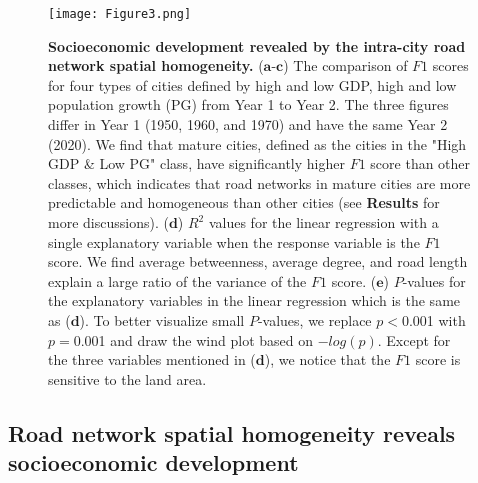 \documentclass[10pt]{wlscirep}
\begin{document}
\begin{figure}[H]
\centering
\begin{minipage}{1.00\textwidth}
    \centering
  \texttt{[image: Figure3.png]}
  \label{fig:3}
\end{minipage}
\caption{\footnotesize
\textbf{Socioeconomic development revealed by the intra-city road network spatial homogeneity.} ($\textbf{a}$-$\textbf{c}$) The comparison of $F1$ scores for four types of cities defined by high and low GDP, high and low population growth (PG) from Year 1 to Year 2. The three figures differ in Year 1 (1950, 1960, and 1970) and have the same Year 2 (2020). We find that mature cities, defined as the cities in the "High GDP \& Low PG" class, have significantly higher $F1$ score than other classes, which indicates that road networks in mature cities are more predictable and homogeneous than other cities (see \textbf{Results} for more discussions). ($\textbf{d}$) $R^{2}$ values for the linear regression with a single explanatory variable when the response variable is the $F1$ score. We find average betweenness, average degree, and road length explain a large ratio of the variance of the $F1$ score. ($\textbf{e}$) $P$-values for the explanatory variables in the linear regression which is the same as ($\textbf{d}$). To better visualize small $P$-values, we replace $p$$<$0.001 with $p$$=$0.001 and draw the wind plot based on $-log(p)$. Except for the three variables mentioned in ($\textbf{d}$), we notice that the $F1$ score is sensitive to the land area.
}
\label{fig:3}
\end{figure}

\subsection*{Road network spatial homogeneity reveals socioeconomic development}
\end{document}
